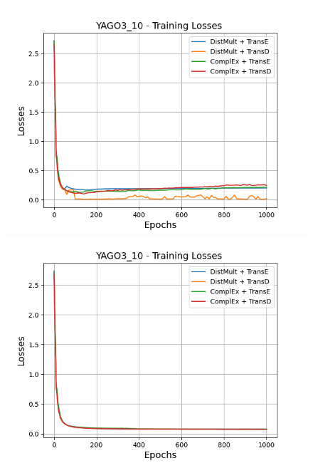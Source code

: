 \begin{figure}[H]
    \centering
    \begin{minipage}{.45\textwidth}
      \centering
      \includegraphics[width=0.9\linewidth]{figures/results/gan_train/not_pretrained/uncertainty/max/entropy/yago3_10/1k_epochs/uncertainty_yago3_10_losses.png}
    \end{minipage}%
    \begin{minipage}{.45\textwidth}
      \centering
      \includegraphics[width=0.9\linewidth]{figures/results/gan_train/not_pretrained/uncertainty/max_distribution/entropy/yago3_10/1k_epochs/uncertainty_yago3_10_losses.png}
    \end{minipage}
    \begin{minipage}{.45\textwidth}
      \centering

\end{minipage}
\end{figure}
